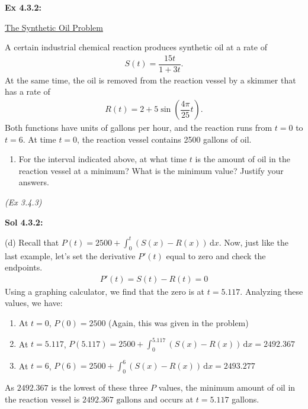 \begin{tcolorbox}[example]
    \textbf{Ex 4.3.2: } \begin{center}
        \underline{The Synthetic Oil Problem}
    \end{center} \vspace{11pt}
    A certain industrial chemical reaction produces synthetic oil at a rate of \begin{align*}
        S(t) = \dfrac{15t}{1 + 3t}.
    \end{align*}
    At the same time, the oil is removed from the reaction vessel by a skimmer that has a rate of \begin{align*}
        R(t) = 2 + 5\sin \left(\dfrac{4\pi}{25}t\right).
    \end{align*}
    Both functions have units of gallons per hour, and the reaction runs from $t = 0$ to $t = 6$. At time $t = 0$, the reaction vessel contains 2500 gallons of oil. \\
    \begin{enumerate}[label=\hspace{11pt}(\alph*), align=left, leftmargin=*, labelsep=0.25em, start=4]
        \item For the interval indicated above, at what time $t$ is the amount of oil in the reaction vessel at a minimum? What is the minimum value? Justify your answers.
    \end{enumerate} \vspace{11pt}
    \footnotesize{\textit{(Ex 3.4.3)}}
\end{tcolorbox}
\begin{tcolorbox}[solution]
    \textbf{Sol 4.3.2: } \par
    (d) Recall that $P(t) = 2500 + \int_0^t (S(x) - R(x)) \,\mathrm{d}x$. Now, just like the last example, let's set the derivative $P'(t)$ equal to zero and check the endpoints. \begin{align*}
        P'(t) = S(t) - R(t) = 0
    \end{align*}
    Using a graphing calculator, we find that the zero is at $t = 5.117$. Analyzing these values, we have: \par
    \vspace{11pt}
    \begin{enumerate}
        \item At $t = 0$, $P(0) = 2500$ (Again, this was given in the problem) \\
        \item At $t = 5.117$, $P(5.117) = 2500 + \int_0^{5.117} (S(x) - R(x)) \,\mathrm{d}x = 2492.367$ \\
        \item At $t = 6$, $P(6) = 2500 + \int_0^{6} (S(x) - R(x)) \,\mathrm{d}x = 2493.277$ \\
    \end{enumerate} \vspace{11pt}

    As $2492.367$ is the lowest of these three $P$ values, the minimum amount of oil in the reaction vessel is $\boxed{2492.367 \text{ gallons}}$ and occurs at $\boxed{t = 5.117}$ gallons.
\end{tcolorbox}

